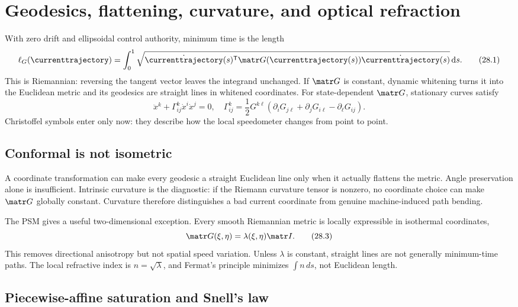 \section{Geodesics, flattening, curvature, and optical refraction}
\label{sec:geodesics-curvature}

With zero drift and ellipsoidal control authority, minimum time is the length
\[
 \ell_G(\currenttrajectory)=\int_0^1
 \sqrt{\dot{\currenttrajectory}(s)^{\mathsf T}\matr G(\currenttrajectory(s))\dot{\currenttrajectory}(s)}\,\mathrm ds.
 \tag{28.1}
\]
This is Riemannian: reversing the tangent vector leaves the integrand
unchanged.  If \(\matr G\) is constant, dynamic whitening turns it into the
Euclidean metric and its geodesics are straight lines in whitened coordinates.
For state-dependent \(\matr G\), stationary curves satisfy
\[
 \ddot x^k+\Gamma^k_{ij}\dot x^i\dot x^j=0,
 \quad
 \Gamma^k_{ij}=\frac12G^{k\ell}
 (\partial_iG_{j\ell}+\partial_jG_{i\ell}-\partial_\ell G_{ij}).
 \tag{28.2}
\]
Christoffel symbols enter only now: they describe how the local speedometer
changes from point to point.

\subsection{Conformal is not isometric}

A coordinate transformation can make every geodesic a straight Euclidean line
only when it actually flattens the metric.  Angle preservation alone is
insufficient.  Intrinsic curvature is the diagnostic: if the Riemann curvature
tensor is nonzero, no coordinate choice can make \(\matr G\) globally
constant.  Curvature therefore distinguishes a bad current coordinate from
genuine machine-induced path bending.

The PSM gives a useful two-dimensional exception.  Every smooth Riemannian
metric is locally expressible in isothermal coordinates,
\[
 \matr G(\xi,\eta)=\lambda(\xi,\eta)\matr I.
 \tag{28.3}
\]
This removes directional anisotropy but not spatial speed variation.  Unless
\(\lambda\) is constant, straight lines are not generally minimum-time paths.
The local refractive index is \(n=\sqrt{\lambda}\), and Fermat's principle
minimizes \(\int n\,ds\), not Euclidean length.

\subsection{Piecewise-affine saturation and Snell's law}

